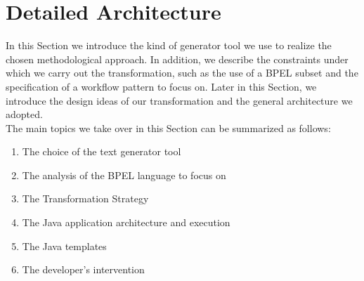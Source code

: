 \section{Detailed Architecture}
\label{DetailedArchitecture}
In this Section we introduce the kind of generator tool we use to realize the chosen methodological approach. In addition, we describe the constraints under which we carry out the transformation, such as the use of a BPEL subset and the specification of a workflow pattern to focus on.
Later in this Section, we introduce the design ideas of our transformation and the general architecture we adopted.\\
The main topics we take over in this Section can be summarized as follows:
\begin{enumerate}
 \item The choice of the text generator tool 
 \item The analysis of the BPEL language to focus on
 \item The Transformation Strategy
 \item The Java application architecture and execution
 \item The Java templates
 \item The developer's intervention
\end{enumerate}

% 
%  
%  

